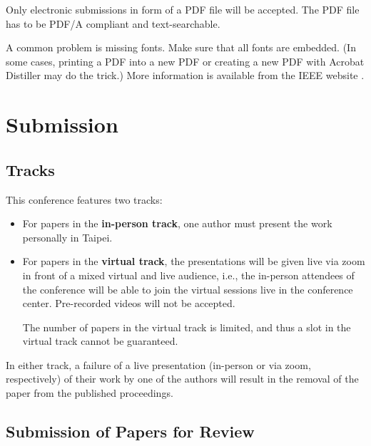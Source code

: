 \documentclass[conference,a4paper]{IEEEtran}
\begin{document}
Only electronic submissions in form of a PDF file will be
accepted. The PDF file has to be PDF/A compliant and text-searchable.

A common problem is missing fonts. Make sure that all fonts are
embedded. (In some cases, printing a PDF into a new PDF or creating a
new PDF with Acrobat Distiller may do the trick.) More information is
available from the IEEE website \cite{IEEE:AuthorToolbox}.

\enlargethispage{-1.4cm} 


\section{Submission}
\label{sec:submission}

\subsection{Tracks}
\label{sec:tracks}

This conference features two tracks:
\begin{itemize}
\item For papers in the \textbf{in-person track}, one author must
  present the work personally in Taipei.
\item For papers in the \textbf{virtual track}, the presentations will
  be given live via zoom in front of a mixed virtual and live
  audience, i.e., the in-person attendees of the conference will be
  able to join the virtual sessions live in the conference
  center. Pre-recorded videos will not be accepted.

  The number of papers in the virtual track is limited, and thus a
  slot in the virtual track cannot be guaranteed.
\end{itemize}
In either track, a failure of a live presentation (in-person or via
zoom, respectively) of their work by one of the authors will result in
the removal of the paper from the published proceedings.


\subsection{Submission of Papers for Review}
\label{sec:subm-papers-revi}
\end{document}
